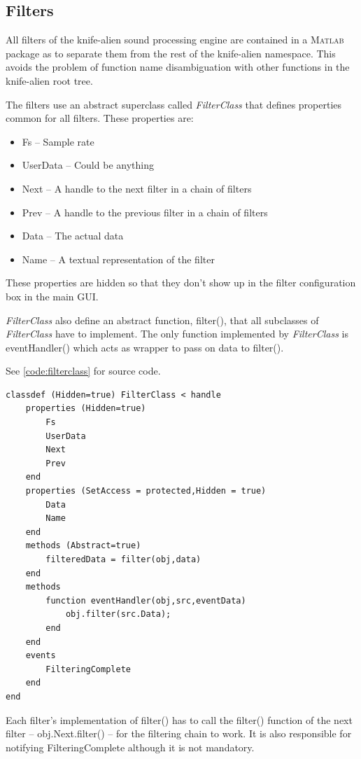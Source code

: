\documentclass[journal]{IEEEtran}
\begin{document}
\subsection{Filters}
All filters of the knife-alien sound processing engine are contained in a \textsc{Matlab} package as to separate them from the rest of the knife-alien namespace. This avoids the problem of function name disambiguation with other functions in the knife-alien root tree.

The filters use an abstract superclass called \emph{FilterClass} that defines properties common for all filters. These properties are:
\begin{itemize} %
\item Fs – Sample rate
\item UserData – Could be anything
\item Next – A handle to the next filter in a chain of filters
\item Prev – A handle to the previous filter in a chain of filters
\item Data – The actual data
\item Name – A textual representation of the filter
\end{itemize}
These properties are hidden so that they don't show up in the filter configuration box in the main GUI.

\emph{FilterClass} also define an abstract function, filter(), that all subclasses of \emph{FilterClass} have to implement. The only function implemented by \emph{FilterClass} is eventHandler() which acts as wrapper to pass on data to filter().

See \autoref*{code:filterclass} for source code.

\begin{lstlisting}[caption={FilterClass.m: Superclass of all filters},label={code:filterclass}]
classdef (Hidden=true) FilterClass < handle
    properties (Hidden=true)
        Fs
        UserData
        Next
        Prev
    end
    properties (SetAccess = protected,Hidden = true)
        Data
        Name
    end
    methods (Abstract=true)
        filteredData = filter(obj,data)
    end
    methods
        function eventHandler(obj,src,eventData)
            obj.filter(src.Data);
        end
    end
    events
        FilteringComplete
    end
end
\end{lstlisting}

Each filter's implementation of filter() has to call the filter() function of the next filter -- obj.Next.filter() -- for the filtering chain to work. It is also responsible for notifying FilteringComplete although it is not mandatory.
\end{document}
